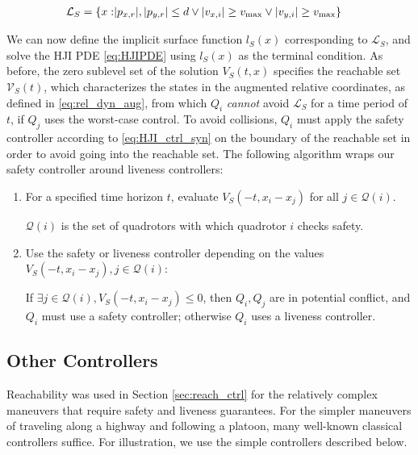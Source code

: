 \begin{equation}
\begin{aligned}
\mathcal{L}_S = \{x: &|p_{x,r}|, |p_{y,r}|\le d \vee |v_{x,i}| \ge v_\text{max} \vee |v_{y,i}| \ge v_\text{max} \}
\end{aligned}
\end{equation}

We can now define the implicit surface function $l_S(x)$ corresponding to $\mathcal{L}_S$, and solve the HJI PDE \eqref{eq:HJIPDE} using $l_S(x)$ as the terminal condition. As before, the zero sublevel set of the solution $V_S(t,x)$ specifies the reachable set $\mathcal{V}_S(t)$, which characterizes the states in the augmented relative coordinates, as defined in \eqref{eq:rel_dyn_aug}, from which $Q_i$ \textit{cannot} avoid $\mathcal{L}_S$ for a time period of $t$, if $Q_j$ uses the worst-case control. To avoid collisions, $Q_i$ must apply the safety controller according to \eqref{eq:HJI_ctrl_syn} on the boundary of the reachable set in order to avoid going into the reachable set. The following algorithm wraps our safety controller around liveness controllers:

\begin{enumerate}
\item For a specified time horizon $t$, evaluate $V_S(-t,x_i-x_j)$ for all $j\in \mathcal{Q}(i)$.

$\mathcal{Q}(i)$ is the set of quadrotors with which quadrotor $i$ checks safety.
\item Use the safety or liveness controller depending on the values $V_S(-t,x_i-x_j),j\in \mathcal{Q}(i)$: 

If $\exists j\in \mathcal{Q}(i),V_S(-t,x_i-x_j)\le 0$, then $Q_i,Q_j$ are in potential conflict, and $Q_i$ must use a safety controller; otherwise $Q_i$ uses a liveness controller.
\end{enumerate}

\subsection{Other Controllers \label{sec:other_ctrl}}
Reachability was used in Section \ref{sec:reach_ctrl} for the relatively complex maneuvers that require safety and liveness guarantees. For the simpler maneuvers of traveling along a highway and following a platoon, many well-known classical controllers suffice. For illustration, we use the simple controllers described below.

